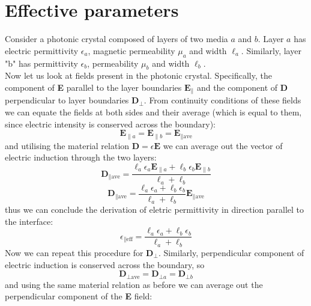 \documentclass[a4paper]{scrartcl}
\begin{document}
\section{Effective parameters}
Consider a photonic crystal composed of layers of two media $a$ and $b$. Layer $a$ has electric permittivity
$\epsilon_{a}$, magnetic permeability $\mu_{a}$ and width $\ell_{a}$. Similarly, layer "b" has permittivity
$\epsilon_{b}$, permeability $\mu_{b}$ and width $\ell_{b}$.
\\
Now let us look at fields present in the photonic crystal. Specifically, the component of \textbf{E} parallel to the
layer boundaries $\mathbf{E_\parallel}$ and the component of \textbf{D} perpendicular to layer boundaries
$\mathbf{D_\bot}$. From continuity conditions of these
fields we can equate the fields at both sides and their average (which is equal to them, since electric intensity is
conserved across the boundary):
\begin{equation}
      \mathbf{E}_{\parallel a} = \mathbf{E}_{\parallel b } = \mathbf{E}_{\parallel \textrm{ave} }
\end{equation}
and utilising the material relation $\mathbf{D}=\epsilon \mathbf{E}$ we can average out the vector of electric induction
through the two layers:
\begin{equation}
      \mathbf{D}_{\parallel \textrm{ave} } = \frac{\ell_{a } \epsilon_{a } \mathbf{E}_{\parallel
            a } + \ell_{b } \epsilon_{ b }
\mathbf{E}_{\parallel b} }{\ell_{a} + \ell_{b}}
\end{equation}
\begin{equation}
      \mathbf{D}_{\parallel \textrm{ave} } = \frac{\ell_{a } \epsilon_{a } + \ell_{b }
      \epsilon_{b } }{\ell_{a } + \ell_{b }}
      \mathbf{E}_{\parallel \textrm{ave} }
\end{equation}
thus we can conclude the derivation of eletric permittivity in direction parallel to the interface:
\begin{equation}
      \epsilon_{\parallel \textrm{eff} } = \frac{\ell_a \epsilon_a + \ell_b
      \epsilon_b}{\ell_a + \ell_b }
\end{equation}
Now we can repeat this procedure for $\mathbf{D}_\bot$. Similarly, perpendicular component of electric induction is
conserved across the boundary, so
\begin{equation}
      \mathbf{D}_{\bot \textrm{ave} } = \mathbf{D}_{\bot a } = \mathbf{D}_{\bot b }
\end{equation}
and using the same material relation as before we can average out the perpendicular component of the \textbf{E} field:
\end{document}

